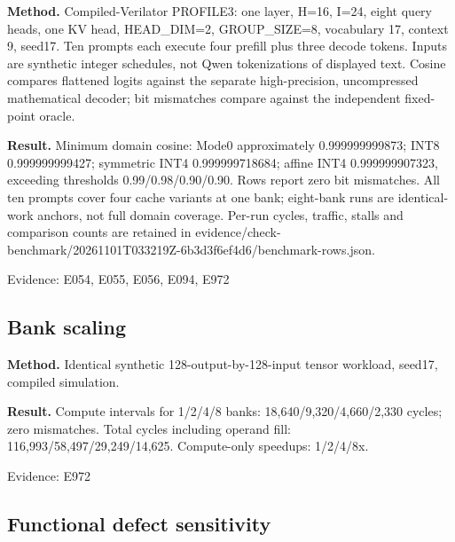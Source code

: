\documentclass[11pt,a4paper]{article}
\begin{document}
\textbf{Method.} Compiled-Verilator PROFILE3: one layer,\allowbreak{} H=\allowbreak{}16,\allowbreak{} I=\allowbreak{}24,\allowbreak{} eight query heads,\allowbreak{} one KV head,\allowbreak{} HEAD\_\allowbreak{}DIM=\allowbreak{}2,\allowbreak{} GROUP\_\allowbreak{}SIZE=\allowbreak{}8,\allowbreak{} vocabulary 17,\allowbreak{} context 9,\allowbreak{} seed17. Ten prompts each execute four prefill plus three decode tokens. Inputs are synthetic integer schedules,\allowbreak{} not Qwen tokenizations of displayed text. Cosine compares flattened logits against the separate high-precision,\allowbreak{} uncompressed mathematical decoder; bit mismatches compare against the independent fixed-point oracle.

\textbf{Result.} Minimum domain cosine: Mode0 approximately 0.999999999873; INT8 0.999999999427; symmetric INT4 0.999999718684; affine INT4 0.999999907323,\allowbreak{} exceeding thresholds 0.99/\allowbreak{}0.98/\allowbreak{}0.90/\allowbreak{}0.90. Rows report zero bit mismatches. All ten prompts cover four cache variants at one bank; eight-bank runs are identical-work anchors,\allowbreak{} not full domain coverage. Per-run cycles,\allowbreak{} traffic,\allowbreak{} stalls and comparison counts are retained in evidence/\allowbreak{}check-benchmark/\allowbreak{}20261101T033219Z-6b3d3f6ef4d6/\allowbreak{}benchmark-rows.json.

{\small Evidence: E054,\allowbreak{} E055,\allowbreak{} E056,\allowbreak{} E094,\allowbreak{} E972}

\subsection{Bank scaling}

\textbf{Method.} Identical synthetic 128-output-by-128-input tensor workload,\allowbreak{} seed17,\allowbreak{} compiled simulation.

\textbf{Result.} Compute intervals for 1/\allowbreak{}2/\allowbreak{}4/\allowbreak{}8 banks: 18,\allowbreak{}640/\allowbreak{}9,\allowbreak{}320/\allowbreak{}4,\allowbreak{}660/\allowbreak{}2,\allowbreak{}330 cycles; zero mismatches. Total cycles including operand fill: 116,\allowbreak{}993/\allowbreak{}58,\allowbreak{}497/\allowbreak{}29,\allowbreak{}249/\allowbreak{}14,\allowbreak{}625. Compute-only speedups: 1/\allowbreak{}2/\allowbreak{}4/\allowbreak{}8x.

{\small Evidence: E972}

\subsection{Functional defect sensitivity}
\end{document}
